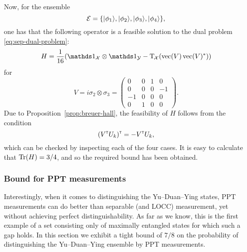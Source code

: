 Now, for the ensemble
\begin{equation}
\label{eq:ydy-ensemble}
  \mathcal{E} = \{ \lvert\mspace{0.5mu} \phi_1 \mspace{0.5mu} \rangle, \lvert\mspace{0.5mu} \phi_2 \mspace{0.5mu} \rangle, \lvert\mspace{0.5mu} \phi_3 \mspace{0.5mu} \rangle, \lvert\mspace{0.5mu} \phi_4 \mspace{0.5mu} \rangle \},
\end{equation}
one has that the following operator is a feasible solution to the dual problem
\eqref{eq:sep-dual-problem}:
\begin{equation}
  \label{eq:H_2}
  H = \frac{1}{16}(\I_{\X}\otimes\I_{\Y} - 
  \pt_{\negsmallspace\X}(\vec(V)\vec(V)^{\ast}))
\end{equation}
for
\begin{equation}
  V = i \sigma_2 \otimes \sigma_3
  = \begin{pmatrix}
    0 & 0 & 1 & 0\\
    0 & 0 & 0 & -1\\
    -1 & 0 & 0 & 0\\
    0 & 1 & 0 & 0
  \end{pmatrix}.
\end{equation}
Due to Proposition~\ref{prop:breuer-hall}, the feasibility of $H$ follows from
the condition
\begin{equation}
  (V^{{\scriptscriptstyle\mathsf{T}}} U_k)^{{\scriptscriptstyle\mathsf{T}}} = - V^{{\scriptscriptstyle\mathsf{T}}} U_k,
\end{equation}
which can be checked by inspecting each of the four cases.
It is easy to calculate that $\operatorname{Tr}(H) = 3/4$, and so the required bound has been
obtained.

\subsubsection*{Bound for PPT measurements}
Interestingly, when it comes to distinguishing the Yu--Duan--Ying states, 
PPT measurements can do better than separable (and LOCC) measurement, 
yet without achieving perfect distinguishability. As far as we know, this is the
first example of a set consisting only of maximally entangled states for which 
such a gap holds.
In this section we exhibit a tight bound of $7/8$ on the probability of distinguishing
the Yu--Duan--Ying ensemble by PPT measurements.

